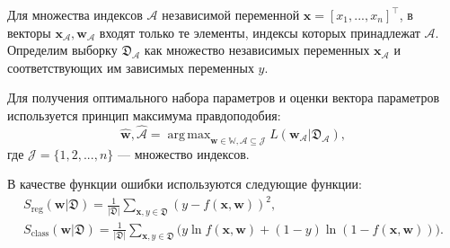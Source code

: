 \documentclass[12pt, a4paper]{scrartcl}
\DeclareMathOperator*{\argmax}{arg\,max}
\DeclareMathOperator*{\argmin}{arg\,min}
\theoremstyle{plain}
\theoremstyle{definition}
\begin{document}






Для множества индексов $\mathcal{A}$ независимой переменной $\mathbf{x} = [x_1, ..., x_n]^{\top}$, в векторы $\mathbf{x}_{\mathcal{A}}, \mathbf{w}_{\mathcal{A}}$ входят только те элементы, индексы которых принадлежат $\mathcal{A}$. Определим выборку $\mathfrak{D}_{\mathcal{A}}$ как множество независимых переменных $\mathbf{x}_{\mathcal{A}}$ и соответствующих им зависимых переменных $y$.


Для получения оптимального набора параметров и оценки вектора параметров используется принцип максимума правдоподобия:
\begin{equation}\label{argmax_L}
\hat{\textbf{w}}, \hat{\mathcal{A}} = \argmax_{\mathbf{w} \in \mathbb{W}, \mathcal{A} \subseteq \mathcal{J}} L(\textbf{w}_{\mathcal{A}} | \mathfrak D_{\mathcal{A}}),
\end{equation}
где $\mathcal{J} = \{1, 2, ..., n\}$ --- множество индексов.

В качестве функции ошибки используются следующие функции:
\begin{equation}\label{MSE_CE}
\begin{split}
S_{\text{reg}}(\textbf{w} | \mathfrak{D}) = \frac{1}{|\mathfrak{D}|}\sum\limits_{\mathbf{x}, y \in \mathfrak{D}}(y - f(\mathbf{x}, \mathbf{w}))^2, ~~~~~~~~~~~~~~~~~~~~~
\\
S_{\text{class}}(\textbf{w} | \mathfrak{D}) =  \frac{1}{|\mathfrak{D}|}\sum\limits_{\mathbf{x}, y \in \mathfrak{D}}\bigl(y\ln f(\mathbf{x}, \mathbf{w}) + (1 - y)\ln(1 - f(\mathbf{x}, \mathbf{w}))\bigr).
\end{split}
\end{equation}
\end{document}
